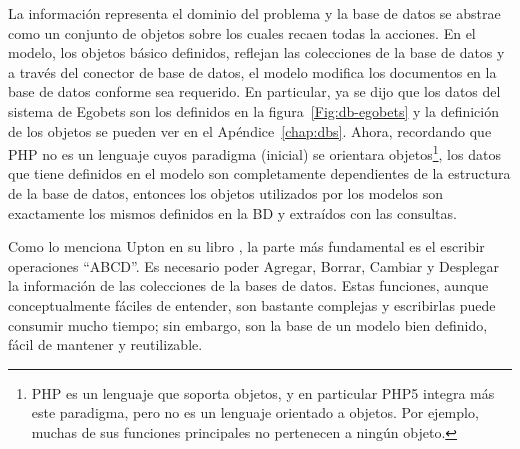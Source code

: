 		La información representa el dominio del problema y la base de datos se abstrae como un conjunto de objetos sobre los cuales recaen todas la acciones. En el modelo, los objetos básico definidos, reflejan las colecciones de la base de datos y a través del conector de base de datos, el modelo modifica los documentos en la base de datos conforme sea requerido.
		En particular, ya se dijo que los datos del sistema de Egobets son los definidos en la figura~\ref{Fig:db-egobets} y la definición de los objetos se pueden ver en el Apéndice~\ref{chap:dbs}. Ahora, recordando que PHP no es un lenguaje cuyos paradigma (inicial) se orientara objetos\footnote{PHP es un lenguaje que soporta objetos, y en particular PHP5 integra más este paradigma, pero no es un lenguaje orientado a objetos. Por ejemplo, muchas de sus funciones principales no pertenecen a ningún objeto.}, los datos que tiene definidos en el modelo son completamente dependientes de la estructura de la base de datos, entonces los objetos utilizados por los modelos son exactamente los mismos definidos en la BD y extraídos con las consultas.

		Como lo menciona Upton en su libro \cite{upton2007codeigniter}, la parte más fundamental es el escribir operaciones ``ABCD''. Es necesario poder Agregar, Borrar, Cambiar y Desplegar la información de las colecciones de la bases de datos. Estas funciones, aunque conceptualmente fáciles de entender, son bastante complejas y escribirlas puede consumir mucho tiempo; sin embargo, son la base de un modelo bien definido, fácil de mantener y reutilizable.

